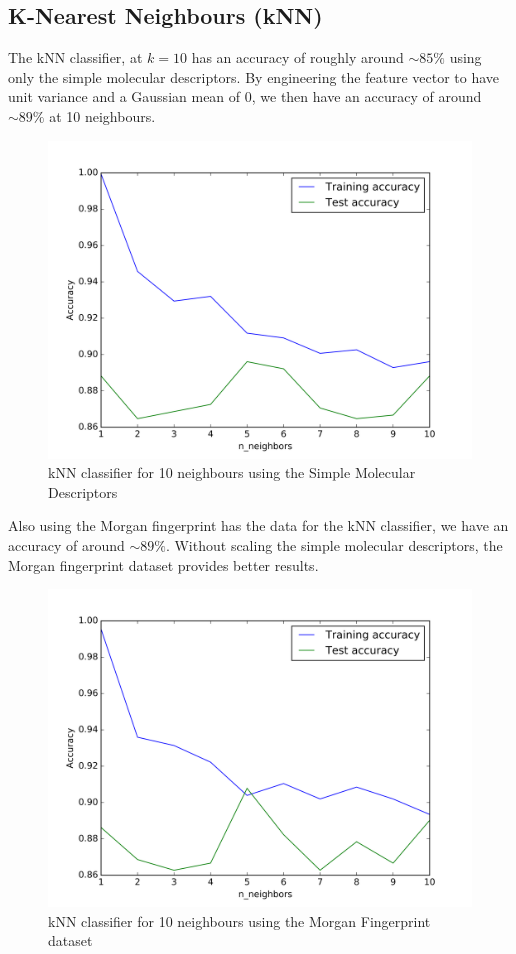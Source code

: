 \documentclass[a4paper,12pt]{report}
\begin{document}
		\subsection{K-Nearest Neighbours (kNN)}
				The kNN classifier, at $k=10$ has an accuracy of roughly around $\sim85\%$ using only the simple molecular descriptors. By engineering the feature vector to have unit variance and a Gaussian mean of 0, we then have an accuracy of around $\sim89\%$ at 10 neighbours. 
				\begin{figure}[H]
					\centering
					\includegraphics[width=\textwidth,scale=1,totalheight=0.4\textheight]{images/knn_molecular_descriptors}
					\caption{kNN classifier for 10 neighbours using the Simple Molecular Descriptors}
					\label{fig:knn_smd}
				\end{figure}
				Also using the Morgan fingerprint has the data for the kNN classifier, we have an accuracy of around $\sim89\%$. Without scaling the simple molecular descriptors, the Morgan fingerprint dataset provides better results.
				\begin{figure}[H]
					\centering
					\includegraphics[width=\textwidth,scale=1,totalheight=0.4\textheight]{images/knn_morgan_dice_fingerprint}
					\caption{kNN classifier for 10 neighbours using the Morgan Fingerprint dataset}
					\label{fig:knn_mfps}
				\end{figure}
\end{document}
